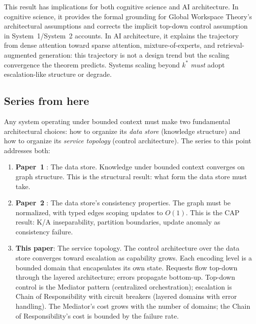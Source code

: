 \documentclass[11pt]{article}
\theoremstyle{definition}
\begin{document}
This result has implications for both cognitive science and AI
architecture. In cognitive science, it provides the formal grounding
for Global Workspace Theory's architectural assumptions and corrects
the implicit top-down control assumption in System~1/System~2 accounts.
In AI architecture, it explains the trajectory from dense attention
toward sparse attention, mixture-of-experts, and retrieval-augmented
generation: this trajectory is not a design trend but the scaling
convergence the theorem predicts. Systems scaling beyond $k^*$
\emph{must} adopt escalation-like structure or degrade.

\subsection*{Series from here}

Any system operating under bounded context must make two fundamental
architectural choices: how to organize its \emph{data store}
(knowledge structure) and how to organize its \emph{service topology}
(control architecture). The series to this point addresses both:

\begin{enumerate}
\item \textbf{Paper~1} \cite{McCarthy2026a}: The data store.
   Knowledge under bounded context converges on graph structure. This is
   the structural result: what form the data store must take.

\item \textbf{Paper~2} \cite{McCarthy2026b}: The data store's
   consistency properties. The graph must be normalized, with typed
   edges scoping updates to $O(1)$. This is the CAP result: K/A
   inseparability, partition boundaries, update anomaly as consistency
   failure.

\item \textbf{This paper}: The service topology. The control
   architecture over the data store converges toward escalation as
   capability grows. Each encoding level is a bounded domain that
   encapsulates its own state. Requests flow top-down through the
   layered architecture; errors propagate bottom-up. Top-down control
   is the Mediator pattern (centralized orchestration); escalation is
   Chain of Responsibility with circuit breakers (layered domains with
   error handling). The Mediator's cost grows with the number of
   domains; the Chain of Responsibility's cost is bounded by the
   failure rate.
\end{enumerate}
\end{document}
